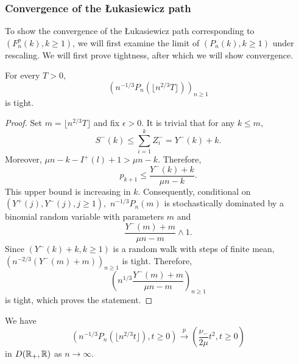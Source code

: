 \subsubsection{Convergence of the \L ukasiewicz path}
To show the convergence of the \L ukasiewicz path corresponding to $(F^p_n(k),k\geq 1)$, we will first examine the limit of $(P_n(k), k\geq 1)$ under rescaling. We will first prove tightness, after which we will show convergence.


\begin{lemma}\label{lemma.tightnesssurplusedges}
 For every $T>0$, $$\left(n^{-1/3}P_n\left(\lfloor  n^{2/3}T\rfloor \right) \right)_{n\geq 1}$$ 
 is tight.
 \end{lemma}
 \begin{proof}
Set $m=\lfloor  n^{2/3}T\rfloor$ and fix $\epsilon>0$. It is trivial that for any $k\leq m$, $$S^{-}(k)\leq \sum_{i=1}^k Z^-_i=Y^-(k)+k.$$ Moreover, $\mu n - k -I^{+}(l)+1>\mu n-k$.  Therefore, $$p_{k+1}\leq \frac{Y^-(k)+k}{\mu n - k}.$$
This upper bound is increasing in $k$. Consequently, conditional on $(Y^+(j),Y^-(j),j\geq 1),$ $n^{-1/3}P_n(m)$ is stochastically dominated by a binomial random variable with parameters  $m$ and $$\frac{Y^-(m)+m}{\mu n - m}\wedge 1.$$
Since $(Y^-(k)+k,k\geq 1)$ is a random walk with steps of finite mean, $\left(n^{-2/3}(Y^-(m)+m)\right)_{n\geq 1}$ is tight. Therefore,
$$\left(n^{1/3} \frac{Y^-(m)+m}{\mu n - m}\right)_{n\geq 1}$$ is tight, which proves the statement.
\end{proof}
\begin{lemma}\label{lemma.convergenceQandP}
We have  
$$\left(n^{-1/3}P_n(\lfloor n^{2/3}t\rfloor), t \geq 0\right)\overset{p}{\to} \left(\frac{\nu_-}{2\mu} t^2, t\geq 0\right)$$
in $D({\mathbb R}_+,{\mathbb R})$ as $n\to \infty$.

\end{lemma}
